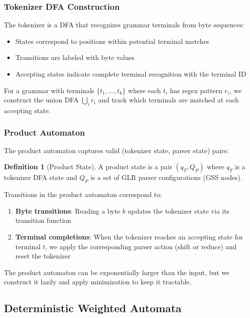 \documentclass[11pt,a4paper]{article}
\theoremstyle{plain}
\theoremstyle{definition}
\newtheorem{definition}[theorem]{Definition}
\theoremstyle{remark}
\begin{document}
\subsubsection{Tokenizer DFA Construction}

The tokenizer is a DFA that recognizes grammar terminals from byte sequences:
\begin{itemize}
\item States correspond to positions within potential terminal matches
\item Transitions are labeled with byte values
\item Accepting states indicate complete terminal recognition with the terminal ID
\end{itemize}

For a grammar with terminals $\{t_1, \ldots, t_k\}$ where each $t_i$ has regex pattern $r_i$, we construct the union DFA $\bigcup_i r_i$ and track which terminals are matched at each accepting state.

\subsubsection{Product Automaton}

The product automaton captures valid (tokenizer state, parser state) pairs:

\begin{definition}[Product State]
A product state is a pair $(q_T, Q_P)$ where $q_T$ is a tokenizer DFA state and $Q_P$ is a set of GLR parser configurations (GSS nodes).
\end{definition}

Transitions in the product automaton correspond to:
\begin{enumerate}
\item \textbf{Byte transitions}: Reading a byte $b$ updates the tokenizer state via its transition function
\item \textbf{Terminal completions}: When the tokenizer reaches an accepting state for terminal $t$, we apply the corresponding parser action (shift or reduce) and reset the tokenizer
\end{enumerate}

The product automaton can be exponentially larger than the input, but we construct it lazily and apply minimization to keep it tractable.

\subsection{Deterministic Weighted Automata}
\label{sec:dwa}
\end{document}
